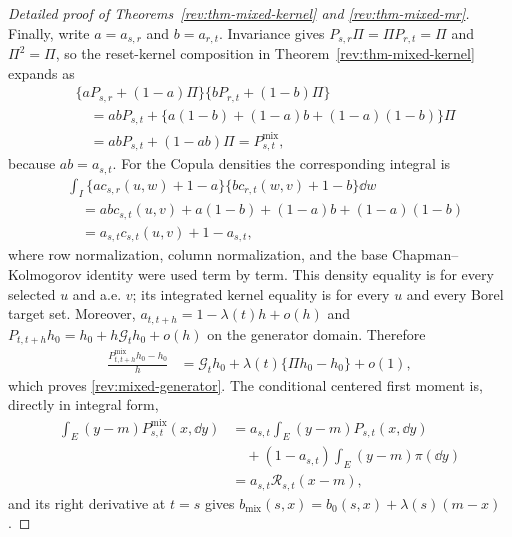 \begin{proof}[Detailed proof of Theorems~\ref{rev:thm-mixed-kernel} and
\ref{rev:thm-mixed-mr}]
Finally, write $a=a_{s,r}$ and $b=a_{r,t}$.  Invariance gives
$P_{s,r}\Pi=\Pi P_{r,t}=\Pi$ and $\Pi^2=\Pi$, so the reset-kernel composition
in Theorem~\ref{rev:thm-mixed-kernel} expands as
\begin{align*}
&\{aP_{s,r}+(1-a)\Pi\}
 \{bP_{r,t}+(1-b)\Pi\}\\
&\quad=abP_{s,t}
 +\{a(1-b)+(1-a)b+(1-a)(1-b)\}\Pi\\
&\quad=abP_{s,t}+(1-ab)\Pi
=P^{\mathrm{mix}}_{s,t},
\end{align*}
because $ab=a_{s,t}$.  For the Copula densities the corresponding integral is
\begin{align*}
&\int_I\{ac_{s,r}(u,w)+1-a\}
          \{bc_{r,t}(w,v)+1-b\}\dd w\\
&\quad=ab c_{s,t}(u,v)+a(1-b)+(1-a)b+(1-a)(1-b)\\
&\quad=a_{s,t}c_{s,t}(u,v)+1-a_{s,t},
\end{align*}
where row normalization, column normalization, and the base
Chapman--Kolmogorov identity were used term by term.  This density equality is
for every selected $u$ and a.e. $v$; its integrated kernel equality is for every
$u$ and every Borel target set.  Moreover,
$a_{t,t+h}=1-\lambda(t)h+o(h)$ and
$P_{t,t+h}h_0=h_0+h\mathcal G_th_0+o(h)$ on the generator domain.  Therefore
\begin{align*}
\frac{P^{\mathrm{mix}}_{t,t+h}h_0-h_0}{h}
&=\mathcal G_th_0
 +\lambda(t)\{\Pi h_0-h_0\}+o(1),
\end{align*}
which proves \eqref{rev:mixed-generator}.  The conditional centered first
moment is, directly in integral form,
\begin{align*}
\int_E(y-m)P^{\mathrm{mix}}_{s,t}(x,\dd y)
&=a_{s,t}\int_E(y-m)P_{s,t}(x,\dd y)\\
&\quad+(1-a_{s,t})\int_E(y-m)\pi(\dd y)\\
&=a_{s,t}\mathcal R_{s,t}(x-m),
\end{align*}
and its right derivative at $t=s$ gives
$b_{\mathrm{mix}}(s,x)=b_0(s,x)+\lambda(s)(m-x)$.
\end{proof}
